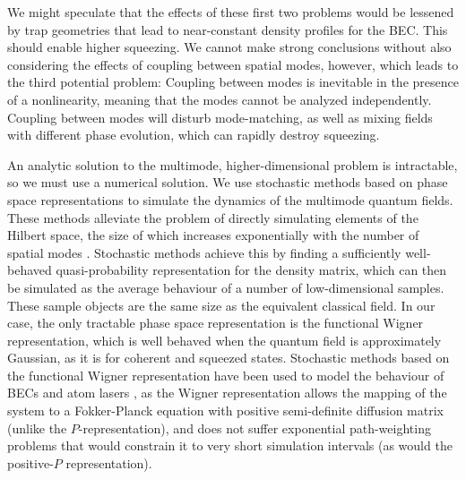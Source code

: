 \documentclass{iopart}
\begin{document}
We might speculate that the effects of these first two problems would be lessened by trap geometries that lead to near-constant density profiles for the BEC.  This should enable higher squeezing.  We cannot make strong conclusions without also considering the effects of coupling between spatial modes, however, which leads to the third potential problem: Coupling between modes is inevitable in the presence of a nonlinearity, meaning that the modes cannot be analyzed independently. Coupling between modes will disturb mode-matching, as well as mixing fields with different phase evolution, which can rapidly destroy squeezing.  

An analytic solution to the multimode, higher-dimensional problem is intractable, so we must use a numerical solution.  We use stochastic methods based on phase space representations to simulate the dynamics of the multimode quantum fields.  These methods alleviate the problem of directly simulating elements of the Hilbert space, the size of which increases exponentially with the number of spatial modes \cite{gardiner1991, steelET1998}.  Stochastic methods achieve this by finding a sufficiently well-behaved quasi-probability representation for the density matrix, which can then be simulated as the average behaviour of a number of low-dimensional samples.  These sample objects are the same size as the equivalent classical field.  In our case, the only tractable phase space representation is the functional Wigner representation, which is well behaved when the quantum field is approximately Gaussian, as it is for coherent and squeezed states.  Stochastic methods based on the functional Wigner representation have been used to model the behaviour of BECs and atom lasers \cite{johnssonET2007,dallET2009,dennisET2010}, as the Wigner representation allows the mapping of the system to a Fokker-Planck equation with positive semi-definite diffusion matrix (unlike the $P$-representation), and does not suffer exponential path-weighting problems that would constrain it to very short simulation intervals (as would the positive-$P$ representation).
\end{document}
